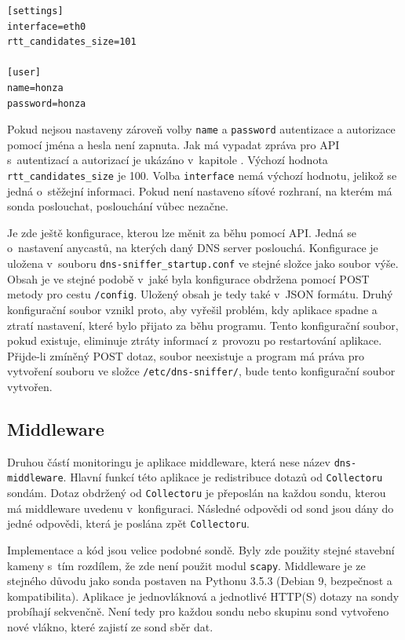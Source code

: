 \documentclass[thesis=M,czech]{src/FITthesis}[2019/12/23]
\begin{document}
\begin{verbatim}
[settings]
interface=eth0
rtt_candidates_size=101

[user]
name=honza
password=honza
\end{verbatim}

Pokud nejsou nastaveny zároveň volby \texttt{name} a \texttt{password} autentizace a autorizace pomocí jména a hesla není zapnuta. Jak má vypadat zpráva pro API s~autentizací a autorizací je ukázáno v~kapitole . Výchozí hodnota \texttt{rtt\_candidates\_size} je 100. Volba \texttt{interface} nemá výchozí hodnotu, jelikož se jedná o~stěžejní informaci. Pokud není nastaveno síťové rozhraní, na kterém má sonda poslouchat, poslouchání vůbec nezačne. 

Je zde ještě konfigurace, kterou lze měnit za běhu pomocí API. Jedná se o~nastavení anycastů, na kterých daný DNS server poslouchá. Konfigurace je uložena v~souboru \texttt{dns-sniffer\_startup.conf} ve stejné složce jako soubor výše. Obsah je ve stejné podobě v~jaké byla konfigurace obdržena pomocí POST metody pro cestu \texttt{/config}. Uložený obsah je tedy také v~JSON formátu. Druhý konfigurační soubor vznikl proto, aby vyřešil problém, kdy aplikace spadne a ztratí nastavení, které bylo přijato za běhu programu. Tento konfigurační soubor, pokud existuje, eliminuje ztráty informací z~provozu po restartování aplikace. Přijde-li zmíněný POST dotaz, soubor neexistuje a program má práva pro vytvoření souboru ve složce \texttt{/etc/dns-sniffer/}, bude tento konfigurační soubor vytvořen. 

\subsection{Middleware}
Druhou částí monitoringu je aplikace middleware, která nese název \linebreak \texttt{dns-middleware}. Hlavní funkcí této aplikace je redistribuce dotazů od \linebreak \texttt{Collectoru} sondám. Dotaz obdržený od \texttt{Collectoru} je přeposlán na každou sondu, kterou má middleware uvedenu v~konfiguraci. Následné odpovědi od sond jsou dány do jedné odpovědi, která je poslána zpět \texttt{Collectoru}. 

Implementace a kód jsou velice podobné sondě. Byly zde použity stejné stavební kameny s~tím rozdílem, že zde není použit modul \texttt{scapy}. Middleware je ze stejného důvodu jako sonda postaven na Pythonu 3.5.3 (Debian 9, bezpečnost a kompatibilita). Aplikace je jednovláknová a jednotlivé HTTP(S) dotazy na sondy probíhají sekvenčně. Není tedy pro každou sondu nebo skupinu sond vytvořeno nové vlákno, které zajistí ze sond sběr dat. 
\end{document}
